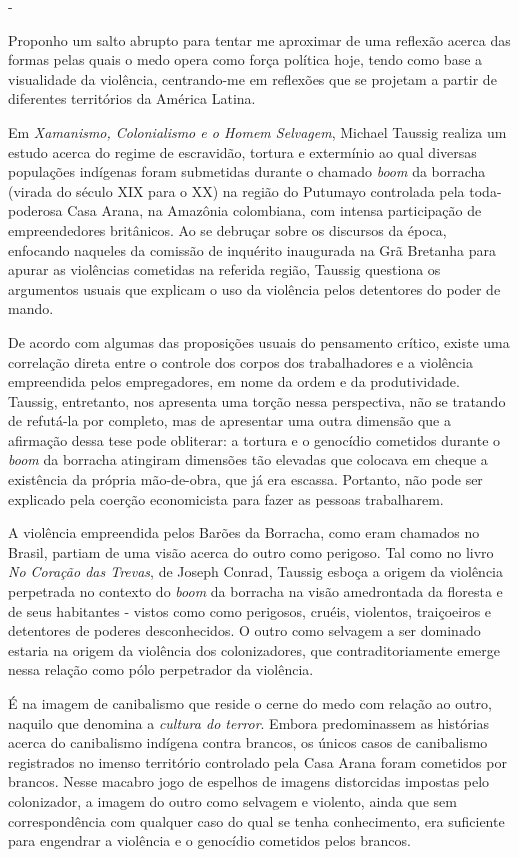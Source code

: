 -

Proponho um salto abrupto para tentar me aproximar de uma reflexão
acerca das formas pelas quais o medo opera como força política hoje,
tendo como base a visualidade da violência, centrando-me em reflexões
que se projetam a partir de diferentes territórios da América Latina.

Em \emph{Xamanismo, Colonialismo e o Homem Selvagem}, Michael Taussig
realiza um estudo acerca do regime de escravidão, tortura e extermínio
ao qual diversas populações indígenas foram submetidas durante o chamado
\emph{boom} da borracha (virada do século XIX para o XX) na região do
Putumayo controlada pela toda-poderosa Casa Arana, na Amazônia
colombiana, com intensa participação de empreendedores britânicos. Ao se
debruçar sobre os discursos da época, enfocando naqueles da comissão de
inquérito inaugurada na Grã Bretanha para apurar as violências cometidas
na referida região, Taussig questiona os argumentos usuais que explicam
o uso da violência pelos detentores do poder de mando.

De acordo com algumas das proposições usuais do pensamento crítico,
existe uma correlação direta entre o controle dos corpos dos
trabalhadores e a violência empreendida pelos empregadores, em nome da
ordem e da produtividade. Taussig, entretanto, nos apresenta uma torção
nessa perspectiva, não se tratando de refutá-la por completo, mas de
apresentar uma outra dimensão que a afirmação dessa tese pode obliterar:
a tortura e o genocídio cometidos durante o \emph{boom} da borracha
atingiram dimensões tão elevadas que colocava em cheque a existência da
própria mão-de-obra, que já era escassa. Portanto, não pode ser
explicado pela coerção economicista para fazer as pessoas trabalharem.

A violência empreendida pelos Barões da Borracha, como eram chamados no
Brasil, partiam de uma visão acerca do outro como perigoso. Tal como no
livro \emph{No Coração das Trevas}, de Joseph Conrad, Taussig esboça a
origem da violência perpetrada no contexto do \emph{boom} da borracha na
visão amedrontada da floresta e de seus habitantes - vistos como como
perigosos, cruéis, violentos, traiçoeiros e detentores de poderes
desconhecidos. O outro como selvagem a ser dominado estaria na origem da
violência dos colonizadores, que contraditoriamente emerge nessa relação
como pólo perpetrador da violência.

É na imagem de canibalismo que reside o cerne do medo com relação ao
outro, naquilo que denomina a \emph{cultura do terror}. Embora
predominassem as histórias acerca do canibalismo indígena contra
brancos, os únicos casos de canibalismo registrados no imenso território
controlado pela Casa Arana foram cometidos por brancos. Nesse macabro
jogo de espelhos de imagens distorcidas impostas pelo colonizador, a
imagem do outro como selvagem e violento, ainda que sem correspondência
com qualquer caso do qual se tenha conhecimento, era suficiente para
engendrar a violência e o genocídio cometidos pelos brancos.

